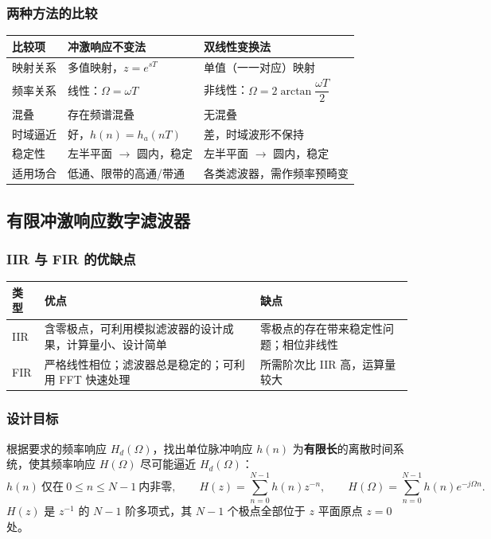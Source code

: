\subsubsection{两种方法的比较}
\begin{center}
\renewcommand{\arraystretch}{1.3}
\small
\begin{tabular}{p{2.6cm}p{5.4cm}p{5.8cm}}
\toprule
比较项 & 冲激响应不变法 & 双线性变换法 \\
\midrule
映射关系 & 多值映射，$z=e^{sT}$ & 单值（一一对应）映射 \\
频率关系 & 线性：$\Omega=\omega T$ & 非线性：$\Omega=2\arctan\dfrac{\omega T}{2}$ \\
混叠 & 存在频谱混叠 & 无混叠 \\
时域逼近 & 好，$h(n)=h_a(nT)$ & 差，时域波形不保持 \\
稳定性 & 左半平面 $\to$ 圆内，稳定 & 左半平面 $\to$ 圆内，稳定 \\
适用场合 & 低通、限带的高通/带通 & 各类滤波器，需作频率预畸变 \\
\bottomrule
\end{tabular}
\end{center}

\subsection{有限冲激响应数字滤波器}

\subsubsection{IIR 与 FIR 的优缺点}
\begin{center}
\begin{tabular}{p{2.2cm}p{6.2cm}p{5.2cm}}
\toprule
类型 & 优点 & 缺点 \\
\midrule
IIR & 含零极点，可利用模拟滤波器的设计成果，计算量小、设计简单 & 零极点的存在带来稳定性问题；相位非线性 \\
FIR & 严格线性相位；滤波器总是稳定的；可利用 FFT 快速处理 & 所需阶次比 IIR 高，运算量较大 \\
\bottomrule
\end{tabular}
\end{center}

\subsubsection{设计目标}
根据要求的频率响应 $H_d(\Omega)$，找出单位脉冲响应 $h(n)$ 为\textbf{有限长}的离散时间系统，使其频率响应 $H(\Omega)$ 尽可能逼近 $H_d(\Omega)$：
\begin{equation}
h(n)\ \text{仅在}\ 0\le n\le N-1\ \text{内非零},\qquad
H(z)=\sum_{n=0}^{N-1}h(n)z^{-n},\qquad
H(\Omega)=\sum_{n=0}^{N-1}h(n)e^{-j\Omega n}.
\end{equation}
$H(z)$ 是 $z^{-1}$ 的 $N-1$ 阶多项式，其 $N-1$ 个极点全部位于 $z$ 平面原点 $z=0$ 处。

